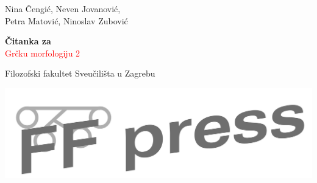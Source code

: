 \begin{titlepage} %

	\raggedleft %
	
	\vspace*{\baselineskip} %
	
	
	{\Large Nina Čengić, Neven Jovanović, \\Petra Matović, Ninoslav Zubović} %
	
	\vspace*{0.167\textheight} %
	
	
	\textbf{\LARGE Čitanka za}\\[\baselineskip] %
	
	{\textcolor{Red}{\Huge Grčku morfologiju 2}}\\[\baselineskip] %
	
	
	\vfill %
	
	
	{\large Filozofski fakultet Sveučilišta u Zagrebu
	
	\medskip
	
\includegraphics[scale=0.20]{ffpress-cb.png} %

}
	
	\vspace*{3\baselineskip} %

\end{titlepage}



